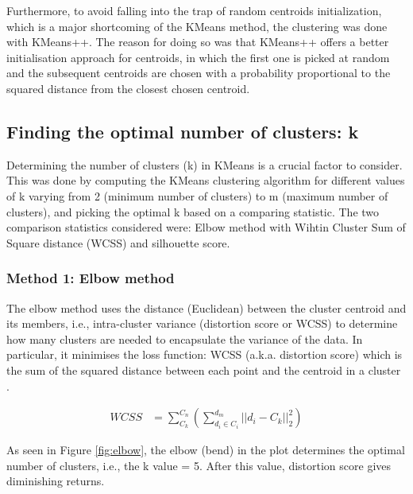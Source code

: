 
Furthermore, to avoid falling into the trap of random centroids initialization, which is a major shortcoming of the KMeans method, the clustering was done with KMeans++. The reason for doing so was that KMeans++ offers a better initialisation approach for centroids, in which the first one is picked at random and the subsequent centroids are chosen with a probability proportional to the squared distance from the closest chosen centroid.


\subsection*{Finding the optimal number of clusters: k}
Determining the number of clusters (k) in KMeans is a crucial factor to consider. This was done by computing the KMeans clustering algorithm for different values of k varying from 2 (minimum number of clusters) to m (maximum number of clusters), and picking the optimal k based on a comparing statistic. The two comparison statistics considered were: Elbow method with Wihtin Cluster Sum of Square distance (WCSS) and silhouette score. 

\subsubsection{Method 1: Elbow method}
The elbow method uses the distance (Euclidean) between the cluster centroid and its members, i.e., intra-cluster variance (distortion score or WCSS) to determine how many clusters are needed to encapsulate the variance of the data. In particular, it minimises the loss function: WCSS (a.k.a. distortion score) which is the sum of the squared distance between each point and the centroid in a cluster \cite{elbowvssil}.

\begin{align}
  \mathit{WCSS} &=  \sum^{C_n}_{C_k} (\sum^{d_m}_{d_i \in C_i} || d_i - C_k ||_2^2) \label{eq:wcss}
\end{align}

As seen in Figure \ref{fig:elbow}, the elbow (bend) in the plot determines the optimal number of clusters, i.e., the k value = 5. After this value, distortion score gives diminishing returns.

